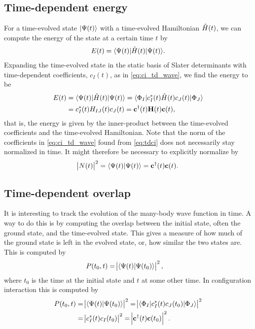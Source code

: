         \subsection{Time-dependent energy}
            For a time-evolved state $| \Psi(t) \rangle$ with a time-evolved
            Hamiltonian $\hat{H}(t)$, we can compute the energy of the state at a
            certain time $t$ by
            \begin{align}
                E(t) = \langle \Psi(t) |\hat{H}(t)| \Psi(t) \rangle.
            \end{align}
            Expanding the time-evolved state in the static basis of Slater
            determinants with time-dependent coefficients, $c_I(t)$, as in
            \autoref{eq:ci_td_wave}, we find the energy to be
            \begin{align}
                E(t)
                &= \langle \Psi(t) |\hat{H}(t)| \Psi(t) \rangle
                = \langle \Phi_I |c^{*}_I(t) \hat{H}(t) c_J(t)| \Phi_J \rangle
                \\
                &= c^{*}_I(t) H_{IJ}(t) c_J(t)
                = \mathbf{c}^{\dagger}(t)\mathbf{H}(t)\mathbf{c}(t),
            \end{align}
            that is, the energy is given by the inner-product between the
            time-evolved coefficients and the time-evolved Hamiltonian.
            Note that the norm of the coefficients in \autoref{eq:ci_td_wave}
            found from \autoref{eq:tdci} does not necessarily stay normalized in
            time.
            It might therefore be necessary to explicitly normalize by
            \begin{align}
                \abs{N(t)}^2
                = \langle \Psi(t) | \Psi(t) \rangle
                = \mathbf{c}^{\dagger}(t)\mathbf{c}(t).
            \end{align}

        \subsection{Time-dependent overlap}
            It is interesting to track the evolution of the many-body wave
            function in time. A way to do this is by computing the overlap
            between the initial state, often the ground state, and the
            time-evolved state. This gives a measure of how much of the ground
            state is left in the evolved state, or, how similar the two states
            are. This is computed by
            \begin{align}
                P(t_0, t)
                &= \abs{\langle \Psi(t) | \Psi(t_0) \rangle}^2,
            \end{align}
            where $t_0$ is the time at the initial state and $t$ at some other
            time. In configuration interaction this is computed by
            \begin{align}
                P(t_0, t)
                &= \abs{\langle \Psi(t) | \Psi(t_0) \rangle}^2
                = \abs{\langle \Phi_I |c^{*}_I(t) c_J(t_0)| \Phi_J \rangle}^2
                \\
                &= \abs{c^{*}_I(t)c_I(t_0)}^2
                = \abs{\mathbf{c}^{\dagger}(t)\mathbf{c}(t_0)}^2.
            \end{align}
